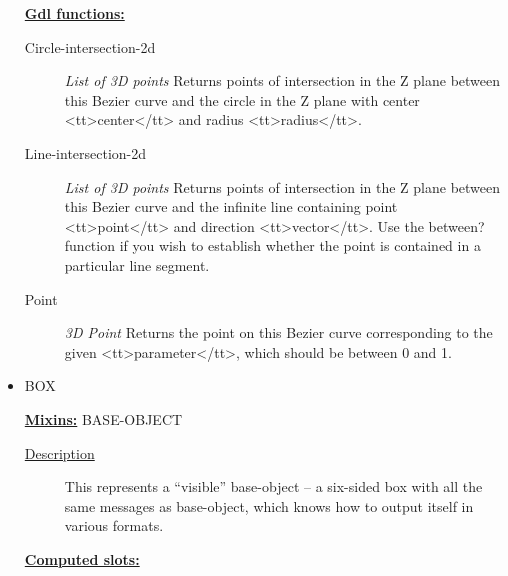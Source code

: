 \documentclass [11pt]{book}
\begin{document}
\begin{itemize}
\begin{description}
\end{description}






\textbf{
\underline{Gdl functions:}}

\begin{description}

\item [Circle-intersection-2d]
\emph{List of 3D points} Returns points of intersection in the Z plane between this Bezier curve and
the circle in the Z plane with center <tt>center</tt> and radius <tt>radius</tt>.


\item [Line-intersection-2d]
\emph{List of 3D points} Returns points of intersection in the Z plane between this Bezier curve
and the infinite line containing point <tt>point</tt> and direction <tt>vector</tt>. Use the
between? function if you wish to establish whether the point is contained in a particular line
segment.


\item [Point]
\emph{3D Point} Returns the point on this Bezier curve corresponding to the given <tt>parameter</tt>,
which should be between 0 and 1.


\end{description}







\item {}BOX


\textbf{
\underline{Mixins:}} BASE-OBJECT





\begin{description}

\item [
\underline{Description}]


This represents a ``visible'' base-object -- a six-sided box with all the same
messages as base-object, which knows how to output itself in various formats.



\end{description}








\textbf{
\underline{Computed slots:}}


\end{itemize}
\end{document}
